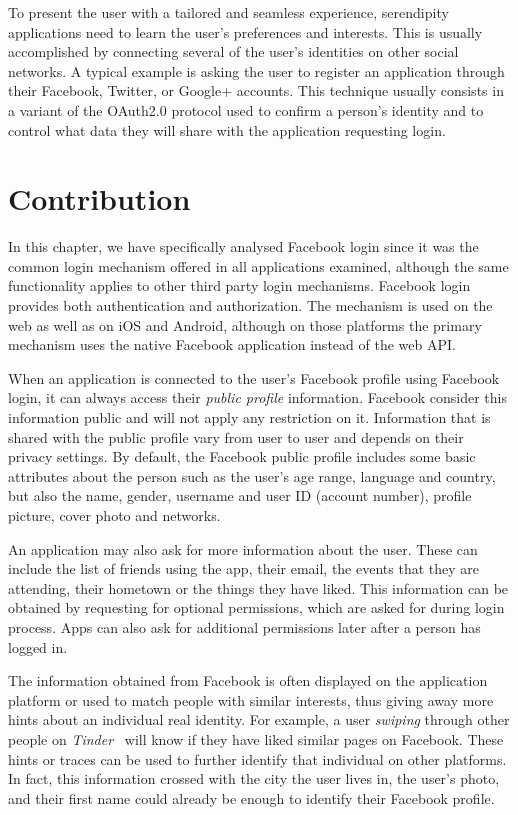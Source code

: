 To present the user with a tailored and seamless experience, serendipity applications need to learn the user's preferences and interests. This is usually accomplished by connecting several of the user's identities on other social networks. A typical example is asking the user to register an application through their Facebook, Twitter, or Google+ accounts. This technique usually consists in a variant of the OAuth2.0 protocol used to confirm a person's identity and to control what data they will share with the application requesting login.

\section{Contribution}

In this chapter, we have specifically analysed Facebook login since it was the common login mechanism offered in all applications examined, although the same functionality applies to other third party login mechanisms. Facebook login provides both authentication and authorization. The mechanism is used on the web as well as on iOS and Android, although on those platforms the primary mechanism uses the native Facebook application instead of the web API.

When an application is connected to the user's Facebook profile using Facebook login, it can always access their \emph{public profile} information. Facebook consider this information public and will not apply any restriction on it. Information that is shared with the public profile vary from user to user and depends on their privacy settings. By default, the Facebook public profile includes some basic attributes about the person such as the user's age range, language and country, but also the name, gender, username and user ID (account number), profile picture, cover photo and networks.

An application may also ask for more information about the user. These can include the list of friends using the app, their email, the events that they are attending, their hometown or the things they have liked. This information can be obtained by requesting for optional permissions, which are asked for during login process. Apps can also ask for additional permissions later after a person has logged in.

The information obtained from Facebook is often displayed on the application platform or used to match people with similar interests, thus giving away more hints about an individual real identity. For example, a user \emph{swiping} through other people on \emph{Tinder}~\cite{tinder} will know if they have liked similar pages on Facebook.
These hints or traces can be used to further identify that individual on other platforms. In fact, this information crossed with the city the user lives in, the user's photo, and their first name could already be enough to identify their Facebook profile.

